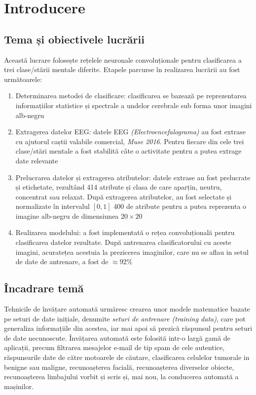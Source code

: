 \chapter{Introducere}\label{ch:1intro}

\section{Tema și obiectivele lucrării}
Această lucrare folosește rețelele neuronale convoluționale pentru clasificarea a trei clase/stării mentale diferite. Etapele parcurse în realizarea lucrării au fost următoarele:
\begin{enumerate}
\item Determinarea metodei de clasificare: clasificarea se bazează pe reprezentarea informațiilor statistice și spectrale a undelor cerebrale sub forma unor imagini alb-negru
\item Extragerea datelor EEG: datele EEG \textit{(Electroencefalograma)} au fost extrase cu ajutorul caștii valabile comercial, \textit{Muse 2016}. Pentru fiecare din cele trei clase/stări mentale a fost stabilită câte o activitate pentru a putea extrage date relevante
\item Prelucrarea datelor și extragerea atributelor: datele extrase au fost prelucrate și etichetate, rezultând 414 atribute și clasa de care aparțin, neutru, concentrat sau relaxat. După extragerea atributelor, au fost selectate și normalizate în intervalul $[0,1]$ 400 de atribute pentru a putea reprezenta o imagine alb-negru de dimensiunea $20\times20$
\item Realizarea modelului: a fost implementată o rețea convoluțională pentru clasificarea datelor rezultate. După antrenarea clasificatorului cu aceste imagini, acuratețea acestuia la prezicerea imaginilor, care nu se aflau in setul de date de antrenare, a fost de $\approx92\%$
\end{enumerate}

\section{Încadrare temă}
Tehnicile de învățare automată urmăresc crearea unor modele matematice bazate pe seturi de date inițiale, denumite \textit{seturi de antrenare (training data)}, care pot generaliza informațiile din acestea, iar mai apoi să prezică răspunsul pentru seturi de date necunoscute. Învățarea automată este folosită intr-o largă gamă de aplicații, precum filtrarea mesajelor e-mail de tip spam de cele autentice, răspunsurile date de către motoarele de căutare, clasificarea celulelor tumorale in benigne sau maligne, recunoașterea facială, recunoașterea diverselor obiecte, recunoașterea limbajului vorbit și scris și, mai nou, la conducerea automată a mașinilor. 

